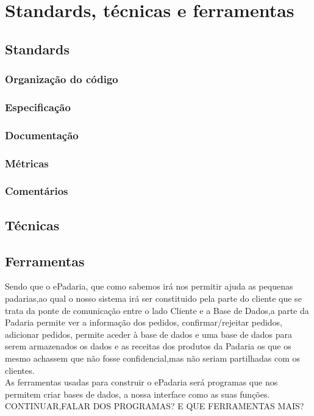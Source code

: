 \chapter{Standards, técnicas e ferramentas}
\label{standards_tecnicas_ferramentas}

\section{Standards}
\subsection{Organização do código}
\subsection{Especificação}
\subsection{Documentação}
\subsection{Métricas}
\subsection{Comentários}

\section{Técnicas}

\section{Ferramentas}
Sendo que o ePadaria, que como sabemos irá nos permitir ajuda as pequenas padarias,ao qual o nosso sistema irá ser constituido pela parte do cliente que se trata da ponte de comunicação entre o lado Cliente e a Base de Dados,a parte da Padaria permite ver a informação dos pedidos, confirmar/rejeitar pedidos, adicionar pedidos, permite aceder à base de dados e uma base de dados para serem armazenados os dados e as receitas dos produtos da Padaria os que os mesmo achassem que não fosse confidencial,mas não seriam partilhadas com os clientes.\\
As ferramentas usadas para construir o ePadaria será programas que nos permitem criar bases de dados, a nossa interface como as suas funções. 
CONTINUAR,FALAR DOS PROGRAMAS? E QUE FERRAMENTAS MAIS?